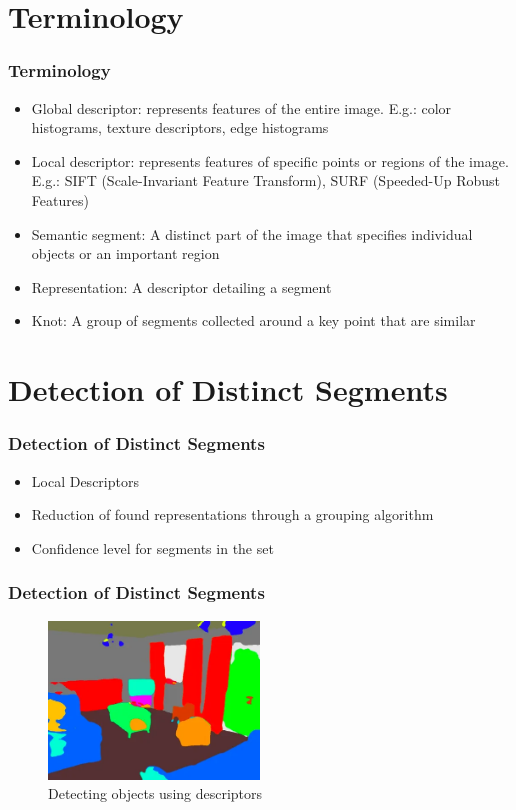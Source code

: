 \documentclass{beamer}
\begin{document}
\section{Terminology}
\begin{frame}
\frametitle{Terminology}

\begin{itemize}
    \item Global descriptor: represents features of the entire image. E.g.: color histograms, texture descriptors, edge histograms
    \item Local descriptor: represents features of specific points or regions of the image. E.g.: SIFT (Scale-Invariant Feature Transform), SURF (Speeded-Up Robust Features)
    \item Semantic segment: A distinct part of the image that specifies individual objects or an important region
    \item Representation: A descriptor detailing a segment
    \item Knot: A group of segments collected around a key point that are similar
\end{itemize}

\end{frame}

\section{Detection of Distinct Segments}
\begin{frame}
\frametitle{Detection of Distinct Segments}

\begin{itemize}
    \item Local Descriptors
    \item Reduction of found representations through a grouping algorithm
    \item Confidence level for segments in the set
\end{itemize}

\end{frame}

\begin{frame}
\frametitle{Detection of Distinct Segments}

\begin{figure}[htbp]
    \centering
    \includegraphics[width=0.5\textwidth]{images/objdet.png}
    \caption{Detecting objects using descriptors}
    \label{fig:desc_objdet}
\end{figure}

\end{frame}
\end{document}
